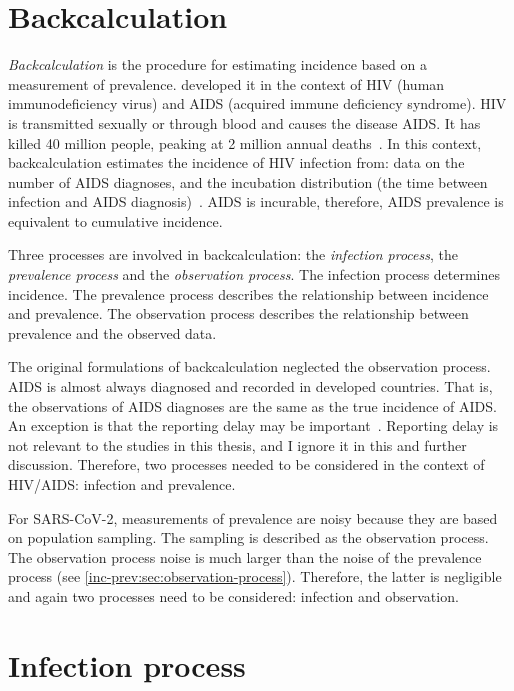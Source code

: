 \documentclass[thesis.tex]{subfiles}
\begin{document}
\section{Backcalculation}

\emph{Backcalculation} is the procedure for estimating incidence based on a measurement of prevalence.
\Textcite{brookmeyerMethod} developed it in the context of HIV (human immunodeficiency virus) and AIDS (acquired immune deficiency syndrome).
HIV is transmitted sexually or through blood and causes the disease AIDS.
It has killed 40 million people, peaking at 2 million annual deaths~\autocite{unaids2023}.
In this context, backcalculation estimates the incidence of HIV infection from: data on the number of AIDS diagnoses, and the incubation distribution (the time between infection and AIDS diagnosis)~\autocites{brookmeyerBackcalculation}{brookmeyerMeasuring}.
AIDS is incurable, therefore, AIDS prevalence is equivalent to cumulative incidence.

Three processes are involved in backcalculation: the \emph{infection process}, the \emph{prevalence process} and the \emph{observation process}.
The infection process determines incidence.
The prevalence process describes the relationship between incidence and prevalence.
The observation process describes the relationship between prevalence and the observed data.

The original formulations of backcalculation neglected the observation process.
AIDS is almost always diagnosed and recorded in developed countries.
That is, the observations of AIDS diagnoses are the same as the true incidence of AIDS.
An exception is that the reporting delay may be important~\autocite{paganoHIV}.
Reporting delay is not relevant to the studies in this thesis, and I ignore it in this and further discussion.
Therefore, two processes needed to be considered in the context of HIV/AIDS: infection and prevalence.

For SARS-CoV-2, measurements of prevalence are noisy because they are based on population sampling.
The sampling is described as the observation process.
The observation process noise is much larger than the noise of the prevalence process (see \cref{inc-prev:sec:observation-process}).
Therefore, the latter is negligible and again two processes need to be considered: infection and observation.

\section{Infection process} \label{inc-prev:sec:infection-process}
\end{document}
